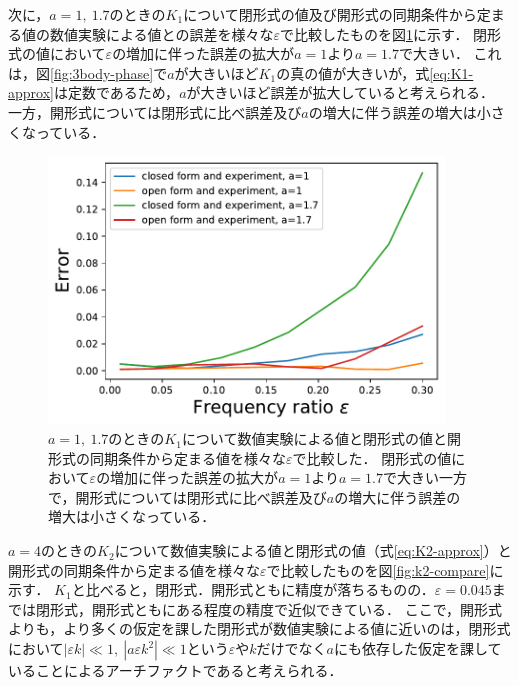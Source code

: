 \documentclass[../main]{subfiles}
\begin{document}
次に，$a=1,\ 1.7$のときの$K_1$について閉形式の値及び開形式の同期条件から定まる値の数値実験による値との誤差を様々な$\varepsilon$で比較したものを図\ref{fig:k1-error}に示す．
閉形式の値において$\varepsilon$の増加に伴った誤差の拡大が$a=1$より$a=1.7$で大きい．
これは，図\ref{fig:3body-phase}で$a$が大きいほど$K_1$の真の値が大きいが，式\eqref{eq:K1-approx}は定数であるため，$a$が大きいほど誤差が拡大していると考えられる．
一方，開形式については閉形式に比べ誤差及び$a$の増大に伴う誤差の増大は小さくなっている．

\begin{figure}[tbp]
\centering
\includegraphics[width=105mm]{./images/k1-error.pdf}
\centering
\caption{$a=1,\ 1.7$のときの$K_1$について数値実験による値と閉形式の値と開形式の同期条件から定まる値を様々な$\varepsilon$で比較した．
閉形式の値において$\varepsilon$の増加に伴った誤差の拡大が$a=1$より$a=1.7$で大きい一方で，開形式については閉形式に比べ誤差及び$a$の増大に伴う誤差の増大は小さくなっている．}
\label{fig:k1-error}
\end{figure}

$a=4$のときの$K_2$について数値実験による値と閉形式の値（式\eqref{eq:K2-approx}）と開形式の同期条件から定まる値を様々な$\varepsilon$で比較したものを図\ref{fig:k2-compare}に示す．
$K_1$と比べると，閉形式．開形式ともに精度が落ちるものの．$\varepsilon=0.045$までは閉形式，開形式ともにある程度の精度で近似できている．
ここで，開形式よりも，より多くの仮定を課した閉形式が数値実験による値に近いのは，閉形式において$|\varepsilon k|\ll 1,\ |a\varepsilon k^2| \ll 1$という$\varepsilon$や$k$だけでなく$a$にも依存した仮定を課していることによるアーチファクトであると考えられる．
\end{document}
